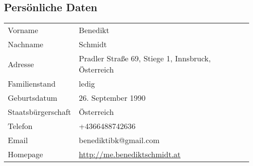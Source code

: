 


\subsection*{Persönliche Daten}
\begin{tabularx}{\textwidth}{l|l}
Vorname & Benedikt \\
Nachname & Schmidt \\
Adresse & Pradler Straße 69, Stiege 1, Innsbruck, Österreich \\
Familienstand & ledig \\
Geburtsdatum & 26. September 1990 \\
Staatsbürgerschaft & Österreich \\
Telefon & +4366488742636 \\
Email & benediktibk@gmail.com \\
Homepage & \url{http://me.benediktschmidt.at}
\end{tabularx}

